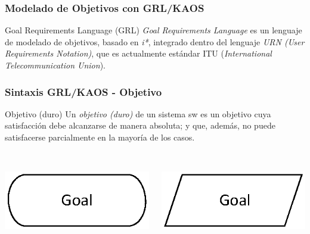 \documentclass[handout,slidestop,xcolor=pst,dvips,blue]{beamer}
\begin{document}
\begin{frame}
    \frametitle{Modelado de Objetivos con GRL/KAOS}
    \begin{block}{Goal Requirements Language (GRL)}
        \emph{Goal Requirements Language} es un lenguaje de modelado de objetivos, basado en \emph{i*}, integrado dentro del lenguaje \emph{URN (User Requirements Notation)}, que es actualmente estándar ITU (\emph{International Telecommunication Union}).
    \end{block}
\end{frame}

\begin{frame}[c]
    \frametitle{Sintaxis GRL/KAOS - Objetivo}
    \begin{block}{Objetivo (duro)}
        Un \alert{\emph{objetivo (duro)}} de un sistema sw es un objetivo cuya satisfacción debe alcanzarse de manera absoluta; y que, además,
        no puede satisfacerse parcialmente en la mayoría de los casos.
        \ \\
        \ \\
        \begin{columns}[c]
            \begin{column}{0.50\linewidth}
                \centering \includegraphics[width=0.5\columnwidth,keepaspectratio=true]{images/objetivos/goal(GRL).eps}
            \end{column}
            \begin{column}{0.50\linewidth}
                \centering \includegraphics[width=0.5\columnwidth,keepaspectratio=true]{images/objetivos/goal(KAOS).eps}
            \end{column}
        \end{columns}
    \end{block}
\end{frame}
\end{document}
